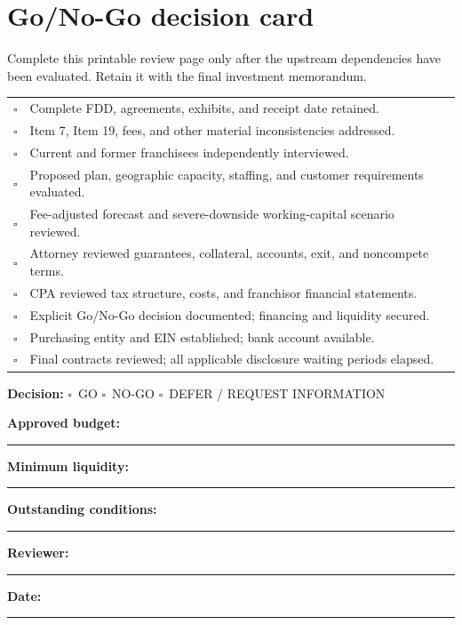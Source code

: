 \documentclass[10pt,letterpaper]{article}
\newcommand{\QBox}{\(\square\)}
\begin{document}
\section{Go/No-Go decision card}
\begin{noteBox}
Complete this printable review page only after the upstream dependencies have been evaluated. Retain it with the final investment memorandum.
\end{noteBox}
\begin{tcolorbox}[colback=white,colframe=Teal,title={\sffamily\bfseries PURCHASE GATE --- PRINT / COMPLETE}]
\begin{tabularx}{\linewidth}{@{}p{.09\linewidth}Y@{}}
\QBox & Complete FDD, agreements, exhibits, and receipt date retained.\\[4pt]
\QBox & Item 7, Item 19, fees, and other material inconsistencies addressed.\\[4pt]
\QBox & Current and former franchisees independently interviewed.\\[4pt]
\QBox & Proposed plan, geographic capacity, staffing, and customer requirements evaluated.\\[4pt]
\QBox & Fee-adjusted forecast and severe-downside working-capital scenario reviewed.\\[4pt]
\QBox & Attorney reviewed guarantees, collateral, accounts, exit, and noncompete terms.\\[4pt]
\QBox & CPA reviewed tax structure, costs, and franchisor financial statements.\\[4pt]
\QBox & Explicit Go/No-Go decision documented; financing and liquidity secured.\\[4pt]
\QBox & Purchasing entity and EIN established; bank account available.\\[4pt]
\QBox & Final contracts reviewed; all applicable disclosure waiting periods elapsed.\\
\end{tabularx}
\tcblower
\textbf{Decision:} \QBox\ GO \qquad \QBox\ NO-GO \qquad \QBox\ DEFER / REQUEST INFORMATION

\vspace{8pt}
\noindent\textbf{Approved budget:} \rule{1.30in}{.4pt}\hfill
\textbf{Minimum liquidity:} \rule{1.35in}{.4pt}

\vspace{10pt}
\textbf{Outstanding conditions:} \rule{4.65in}{.4pt}

\vspace{16pt}
\textbf{Reviewer:} \rule{2.5in}{.4pt}\qquad
\textbf{Date:} \rule{1.65in}{.4pt}
\end{tcolorbox}
\end{document}
